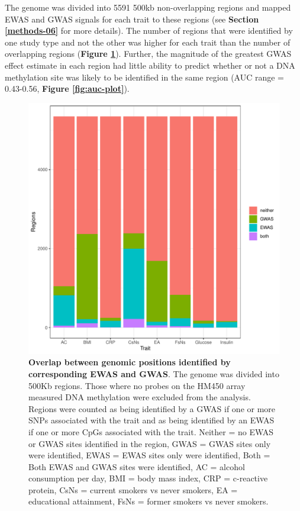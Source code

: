 \documentclass[11pt,oneside]{bristolthesis}
\begin{document}
The genome was divided into 5591 500kb non-overlapping regions and mapped EWAS and GWAS signals for each trait to these regions (see \textbf{Section \ref{methods-06}} for more details). The number of regions that were identified by one study type and not the other was higher for each trait than the number of overlapping regions (\textbf{Figure \ref{fig:overlap-barplot}}). Further, the magnitude of the greatest GWAS effect estimate in each region had little ability to predict whether or not a DNA methylation site was likely to be identified in the same region (AUC range = 0.43-0.56, \textbf{Figure \ref{fig:auc-plot}}).




\begin{figure}

{\centering \includegraphics[width=1\linewidth]{figure/06-ewas_gwas_comparison/all_traits_overlap_bar} 

}

\caption[Overlap between genomic positions identified by corresponding EWAS and GWAS]{\textbf{Overlap between genomic positions identified by corresponding EWAS and GWAS}. The genome was divided into 500Kb regions. Those where no probes on the HM450 array measured DNA methylation were excluded from the analysis. Regions were counted as being identified by a GWAS if one or more SNPs associated with the trait and as being identified by an EWAS if one or more CpGs associated with the trait. Neither = no EWAS or GWAS sites identified in the region, GWAS = GWAS sites only were identified, EWAS = EWAS sites only were identified, Both = Both EWAS and GWAS sites were identified, AC = alcohol consumption per day, BMI = body mass index, CRP = c-reactive protein, CsNs = current smokers vs never smokers, EA = educational attainment, FsNs = former smokers vs never smokers.}\label{fig:overlap-barplot}
\end{figure}
\end{document}

